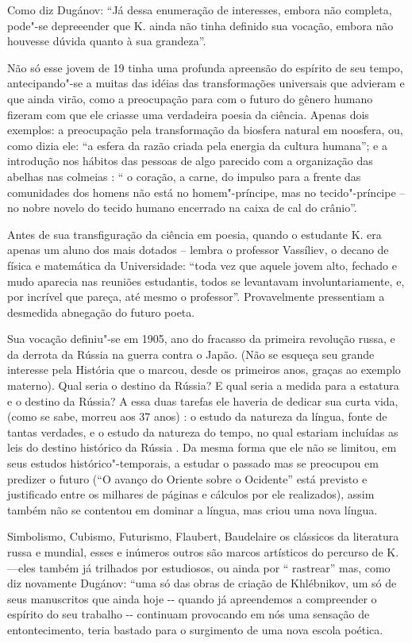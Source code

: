 Como diz Dugánov: ``Já dessa enumeração de interesses, embora não
completa, pode"-se depreeender que K. ainda não tinha definido sua
vocação, embora não houvesse dúvida quanto à sua grandeza''.

Não só esse jovem de 19 tinha uma profunda apreensão do espírito de seu
tempo, antecipando"-se a muitas das idéias das transformações universais
que advieram e que ainda virão, como a preocupação para com o futuro do
gênero humano fizeram com que ele criasse uma verdadeira poesia da
ciência. Apenas dois exemplos: a preocupação pela transformação da
biosfera natural em noosfera, ou, como dizia ele: ``a esfera da razão
criada pela energia da cultura humana''; e a introdução nos hábitos das
pessoas de algo parecido com a organização das abelhas nas colmeias : ``
o coração, a carne, do impulso para a frente das comunidades dos homens
não está no homem"-príncipe, mas no tecido"-príncipe -- no nobre novelo do
tecido humano encerrado na caixa de cal do crânio''.

Antes de sua transfiguração da ciência em poesia, quando o estudante K.
era apenas um aluno dos mais dotados -- lembra o professor Vassíliev, o
decano de física e matemática da Universidade: ``toda vez que aquele
jovem alto, fechado e mudo aparecia nas reuniões estudantis, todos se
levantavam involuntariamente, e, por incrível que pareça, até mesmo o
professor''. Provavelmente pressentiam a desmedida abnegação do futuro
poeta.

Sua vocação definiu"-se em 1905, ano do fracasso da primeira revolução
russa, e da derrota da Rússia na guerra contra o Japão. (Não se esqueça
seu grande interesse pela História que o marcou, desde os primeiros
anos, graças ao exemplo materno). Qual seria o destino da Rússia? E qual
seria a medida para a estatura e o destino da Rússia? A essa duas
tarefas ele haveria de dedicar sua curta vida, (como se sabe, morreu aos
37 anos) : o estudo da natureza da língua, fonte de tantas verdades, e o
estudo da natureza do tempo, no qual estariam incluídas as leis do
destino histórico da Rússia . Da mesma forma que ele não se limitou, em
seus estudos histórico"-temporais, a estudar o passado mas se preocupou
em predizer o futuro (``O avanço do Oriente sobre o Ocidente'' está
previsto e justificado entre os milhares de páginas e cálculos por ele
realizados), assim também não se contentou em dominar a língua, mas
criou uma nova língua.

Simbolismo, Cubismo, Futurismo, Flaubert, Baudelaire os clássicos da
literatura russa e mundial, esses e inúmeros outros são marcos
artísticos do percurso de K.---eles também já trilhados por estudiosos,
ou ainda por `` rastrear'' mas, como diz novamente Dugánov: ``uma só das
obras de criação de Khlébnikov, um só de seus manuscritos que ainda hoje
-\/- quando já apreendemos a compreender o espírito do seu trabalho -\/-
continuam provocando em nós uma sensação de entontecimento, teria
bastado para o surgimento de uma nova escola poética.

